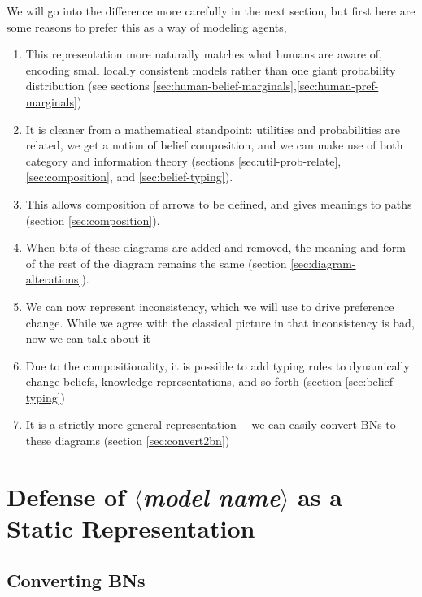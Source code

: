 \documentclass{article}
\newcommand\modelname{{\color{blue!50!black}$\langle$\itshape model name$\rangle$ }}
\begin{document}
	We will go into the difference more carefully in the next section, but first here are some reasons to prefer this as a way of modeling agents,%
	
	\begin{enumerate}[nosep]
		\item This representation more naturally matches what humans are aware of, encoding small locally consistent models rather than one giant probability distribution (see sections \ref{sec:human-belief-marginals},\ref{sec:human-pref-marginals})
		\item It is cleaner from a mathematical standpoint: utilities and probabilities are related, we get a notion of belief composition, and we can make use of both category and information theory (sections \ref{sec:util-prob-relate}, \ref{sec:composition}, and \ref{sec:belief-typing}).
		\item This allows composition of arrows to be defined, and gives meanings to paths (section \ref{sec:composition}).
		\item When bits of these diagrams are added and removed, the meaning and form of the rest of the diagram remains the same (section \ref{sec:diagram-alterations}).
		\item We can now represent inconsistency, which we will use to drive preference change. While we agree with the classical picture in that inconsistency is bad, now we can talk about it
		\item Due to the compositionality, it is possible to add typing rules to dynamically change beliefs, knowledge representations, and so forth (section \ref{sec:belief-typing})
		\item It is a strictly more general representation--- we can easily convert BNs to these diagrams (section \ref{sec:convert2bn})
	\end{enumerate}

	
	
	
	\section{Defense of \modelname as a Static Representation }

	
	
	
	
	
	
	\subsection{Converting BNs}
\end{document}
